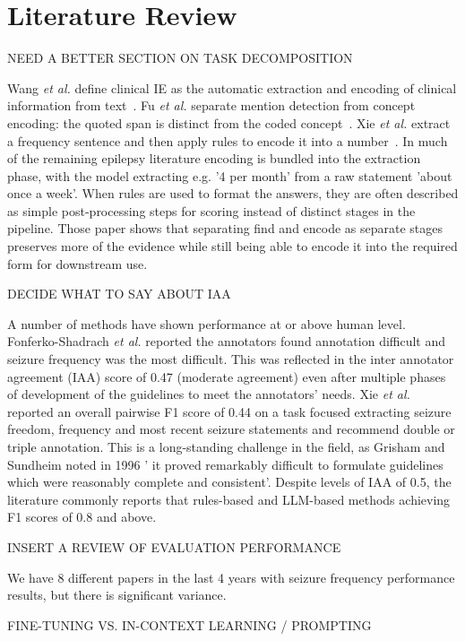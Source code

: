 \documentclass[conference]{IEEEtran}
\begin{document}
\section{Literature Review}

NEED A BETTER SECTION ON TASK DECOMPOSITION

Wang \emph{et al.} define clinical IE as the automatic 
extraction and encoding of clinical information from 
text~\cite{b8}. Fu \emph{et al.} separate mention detection 
from concept encoding: the quoted span is distinct from
the coded concept~\cite{b6}. Xie \emph{et al.} extract a frequency 
sentence and then apply rules to encode it into a number~\cite{b9}. 
In much of the remaining epilepsy literature encoding is 
bundled into the extraction phase, with the model 
extracting e.g. '4 per month' from a raw statement 'about once 
a week'. When rules are used to format the answers, they are 
often described as simple post-processing steps for scoring 
instead of distinct stages in the pipeline. Those paper shows 
that separating find and encode as separate stages 
preserves more of the evidence while still being able to 
encode it into the required form for downstream use.

DECIDE WHAT TO SAY ABOUT IAA

A number of methods have shown performance at 
or above human level. Fonferko-Shadrach \emph{et al.} 
reported the annotators found annotation difficult 
and seizure frequency was the most difficult. This was 
reflected in the inter annotator agreement (IAA) score
of 0.47 (moderate agreement) even after multiple phases 
of development of the guidelines to meet the annotators' 
needs.  Xie \emph{et al.} reported an overall pairwise F1
score of 0.44 on a task focused extracting seizure 
freedom, frequency and most recent seizure
statements and recommend double or triple annotation. 
This is a long-standing challenge in the field, as Grisham 
and Sundheim noted in 1996 ' it proved remarkably difficult
to formulate guidelines which were reasonably complete 
and consistent'. Despite levels of IAA of 0.5, the literature 
commonly reports that rules-based and LLM-based 
methods achieving F1 scores of 0.8 and above. 

INSERT A REVIEW OF EVALUATION PERFORMANCE

We have 8 different papers in the last 4 years with seizure frequency
performance results, but there is significant variance. 


FINE-TUNING VS. IN-CONTEXT LEARNING / PROMPTING
\end{document}
